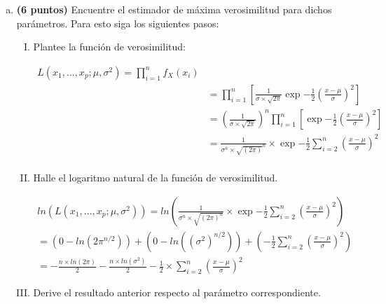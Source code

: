 \documentclass[../main.tex]{subfiles}
\begin{document}
\begin{enumerate}[(a)]

\item \textbf{(6 puntos)} Encuentre el estimador de máxima verosimilitud para dichos parámetros. Para esto siga los siguientes pasos:

\begin{enumerate}[(I)]

\item Plantee la función de verosimilitud:

\begin{equation}
\begin{aligned}
L(x_1, \dots, x_p; 	\mu, \sigma ^2) = \prod_{i =  1}^{n} f_X(x_i) \\
      & = \prod_{i =  1}^{n} \left[ \frac{1}{\sigma \times \sqrt{2 \pi}} \exp{-\frac{1}{2} \left( \frac{x- \mu}{\sigma}\right)^2} \right]  \\
      & = \left( \frac{1}{\sigma \times \sqrt{2 \pi}} \right) ^n\prod_{i =  1}^{n} \left[  \exp{-\frac{1}{2} \left( \frac{x- \mu}{\sigma}\right)^2} \right]   \\
      & = \frac{1}{\sigma^n \times \sqrt{(2 \pi)}^n} \times  \exp{-\frac{1}{2} \sum_{i = 2}^{n}\left( \frac{x- \mu}{\sigma}\right)^2}    \\
\end{aligned}
\end{equation}

\item Halle el logaritmo natural de la función de verosimilitud.

\begin{equation}
\begin{split}
ln(L(x_1, \dots, x_p; 	\mu, \sigma ^2)) = ln \left( \frac{1}{\sigma^n \times \sqrt{(2 \pi)^n}} \times  \exp{-\frac{1}{2} \sum_{i = 2}^{n}\left( \frac{x- \mu}{\sigma}\right)^2}\right) \\
= \left( 0 - ln(2\pi^{n/2})\right) + \left( 0 - ln((\sigma^2)^{n/2})\right) + \left( -\frac{1}{2} \sum_{i = 2}^{n}\left( \frac{x- \mu}{\sigma}\right)^2\right) \\
=  - \frac{n \times ln(2\pi)}{2}   -  \frac{n \times ln(\sigma^2)}{2}  -\frac{1}{2} \times \sum_{i = 2}^{n}\left( \frac{x- \mu}{\sigma}\right)^2
\end{split}
\end{equation}

\item Derive el resultado anterior respecto al parámetro correspondiente.


\end{enumerate}
\end{enumerate}
\end{document}
